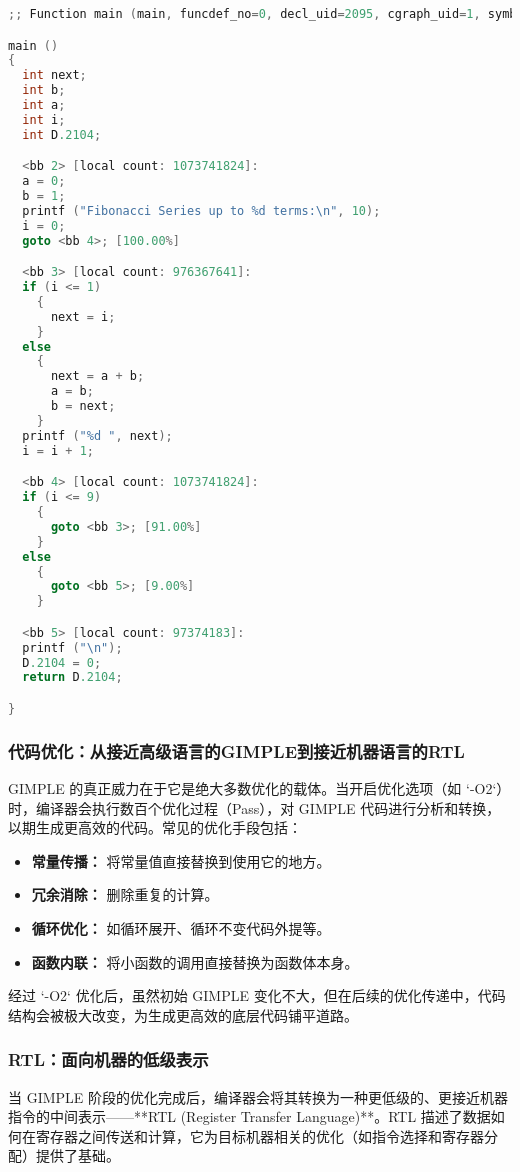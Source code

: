 \documentclass[a4paper]{article}
\begin{document}
\begin{lstlisting}[language=C, caption={fibonacci.c.004t.gimple (未优化)}]
;; Function main (main, funcdef_no=0, decl_uid=2095, cgraph_uid=1, symbol_order=0)

main ()
{
  int next;
  int b;
  int a;
  int i;
  int D.2104;

  <bb 2> [local count: 1073741824]:
  a = 0;
  b = 1;
  printf ("Fibonacci Series up to %d terms:\n", 10);
  i = 0;
  goto <bb 4>; [100.00%]

  <bb 3> [local count: 976367641]:
  if (i <= 1)
    {
      next = i;
    }
  else
    {
      next = a + b;
      a = b;
      b = next;
    }
  printf ("%d ", next);
  i = i + 1;

  <bb 4> [local count: 1073741824]:
  if (i <= 9)
    {
      goto <bb 3>; [91.00%]
    }
  else
    {
      goto <bb 5>; [9.00%]
    }

  <bb 5> [local count: 97374183]:
  printf ("\n");
  D.2104 = 0;
  return D.2104;

}
\end{lstlisting}

\subsubsection{代码优化：从接近高级语言的GIMPLE到接近机器语言的RTL}

GIMPLE 的真正威力在于它是绝大多数优化的载体。当开启优化选项（如 `-O2`）时，编译器会执行数百个优化过程（Pass），对 GIMPLE 代码进行分析和转换，以期生成更高效的代码。常见的优化手段包括：
\begin{itemize}
    \item \textbf{常量传播：} 将常量值直接替换到使用它的地方。
    \item \textbf{冗余消除：} 删除重复的计算。
    \item \textbf{循环优化：} 如循环展开、循环不变代码外提等。
    \item \textbf{函数内联：} 将小函数的调用直接替换为函数体本身。
\end{itemize}
经过 `-O2` 优化后，虽然初始 GIMPLE 变化不大，但在后续的优化传递中，代码结构会被极大改变，为生成更高效的底层代码铺平道路。

\subsubsection{RTL：面向机器的低级表示}

当 GIMPLE 阶段的优化完成后，编译器会将其转换为一种更低级的、更接近机器指令的中间表示——**RTL (Register Transfer Language)**。RTL 描述了数据如何在寄存器之间传送和计算，它为目标机器相关的优化（如指令选择和寄存器分配）提供了基础。
\end{document}
